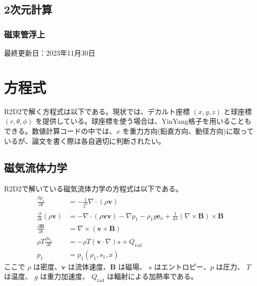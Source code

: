 \documentclass[letterpaper,10pt,dvipdfmx,report]{sphinxmanual}
\begin{document}
\section{2次元計算}
\label{\detokenize{typical_case:id13}}

\subsection{磁束管浮上}
\label{\detokenize{typical_case:id14}}
\sphinxAtStartPar
最終更新日：2023年11月30日

\sphinxstepscope


\chapter{方程式}
\label{\detokenize{equation:id1}}\label{\detokenize{equation::doc}}
\sphinxAtStartPar
R2D2で解く方程式は以下である。現状では、デカルト座標 \((x,y,z)\)  と球座標 \((r,\theta,\phi)\) を提供している。球座標を使う場合は、Yin\sphinxhyphen{}Yang格子を用いることもできる。数値計算コードの中では、\(x\) を重力方向(鉛直方向、動径方向)に取っているが、論文を書く際は各自適切に判断されたい。


\section{磁気流体力学}
\label{\detokenize{equation:id2}}
\sphinxAtStartPar
R2D2で解いている磁気流体力学の方程式は以下である。
\begin{equation*}
\begin{split}\frac{\partial \rho_1}{\partial t} &= - \frac{1}{\xi^2}\nabla\cdot
\left(\rho \boldsymbol{v}\right) \\
\frac{\partial}{\partial t}\left(\rho \boldsymbol{v}\right) &=
-\nabla\cdot\left(\rho\boldsymbol{vv}\right)
- \nabla p_1 - \rho_1 g\boldsymbol{e}_x
+\frac{1}{4\pi}\left(\nabla\times\boldsymbol{B}\right)
\times\boldsymbol{B} \\
\frac{\partial \boldsymbol{B}}{\partial t} &=
\nabla\times\left(\boldsymbol{v\times B}\right)
\\
\rho T \frac{\partial s_1}{\partial t} &= -\rho T
\left(\boldsymbol{v}\cdot\nabla\right) s + Q_\mathrm{rad} \\
p_1 &= p_1(\rho_1,s_1,x)\end{split}
\end{equation*}
\sphinxAtStartPar
ここで \(\rho\) は密度、\(\boldsymbol{v}\) は流体速度、\(\boldsymbol{B}\) は磁場、 \(s\) はエントロピー、\(p\) は圧力、 \(T\) は温度、 \(g\) は重力加速度、 \(Q_\mathrm{rad}\) は輻射による加熱率である。
\end{document}
